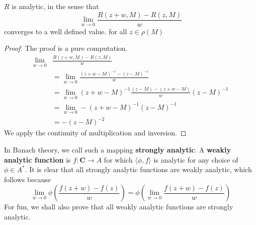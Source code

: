 \begin{lemma}
    $R$ is analytic, in the sense that
    \[ \lim_{w \to 0} \frac{R(z + w, M) - R(z,M)}{w} \]
    converges to a well defined value. for all $z \in \rho(M)$
\end{lemma}
\begin{proof}
    The proof is a pure computation.
    \begin{align*}
        \lim_{w \to 0} &\frac{R(z + w, M) - R(z,M)}{w}\\
        &= \lim_{w \to 0} \frac{(z + w - M)^{-1} - (z - M)^{-1}}{w}\\
        &= \lim_{w \to 0} (z + w - M)^{-1} \frac{(z - M) - (z + w - M)}{w} (z - M)^{-1}\\
        &= \lim_{w \to 0} -(z + w - M)^{-1} (z - M)^{-1}\\
        &= -(z - M)^{-2}
    \end{align*}
    We apply the continuity of multiplication and inversion.
\end{proof}

In Banach theory, we call such a mapping {\bf strongly analytic}. A {\bf weakly analytic function} is $f: \mathbf{C} \to A$ for which $\langle \phi, f \rangle$ is analytic for any choice of $\phi \in A^*$. It is clear that all strongly analytic functions are weakly analytic, which follows because
%
\[ \lim_{w \to 0} \phi \left( \frac{f(z + w) - f(z)}{w} \right) = \phi \left( \lim_{w \to 0} \frac{f(z + w) - f(z)}{w} \right) \]
%
For fun, we shall also prove that all weakly analytic functions are strongly analytic.


